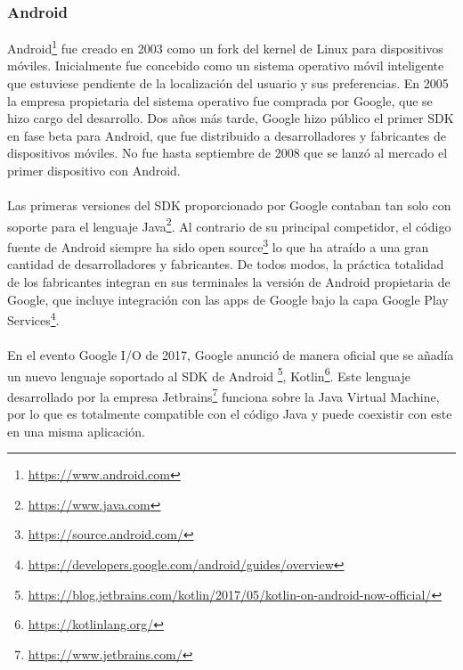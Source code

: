 \documentclass[a4paper, 12pt]{article}
\begin{document}
\subsubsection{Android}
\label{sec-2-1-2}
Android\footnote{\url{https://www.android.com}} fue creado en 2003 como un fork del kernel de Linux para dispositivos
móviles. Inicialmente fue concebido como un sistema operativo móvil inteligente que
estuviese pendiente de la localización del usuario y sus preferencias. En 2005 la
empresa propietaria del sistema operativo fue comprada por Google, que se hizo cargo
del desarrollo. Dos años más tarde, Google hizo público el primer SDK en fase beta
para Android, que fue distribuido a desarrolladores y fabricantes de dispositivos
móviles. No fue hasta septiembre de 2008 que se lanzó al mercado el primer dispositivo
con Android.
\\
\\
Las primeras versiones del SDK proporcionado por Google contaban tan solo con
soporte para el lenguaje Java\footnote{\url{https://www.java.com}}. Al contrario de su principal competidor, el código fuente
de Android siempre ha sido open source\footnote{\url{https://source.android.com/}} lo que ha atraído a una gran cantidad de
desarrolladores y fabricantes. De todos modos, la práctica totalidad de los fabricantes
integran en sus terminales la versión de Android propietaria de Google, que incluye
integración con las apps de Google bajo la capa Google Play Services\footnote{\url{https://developers.google.com/android/guides/overview}}.
\\
\\
En el evento Google I/O de 2017, Google anunció de manera oficial que se añadía un
nuevo lenguaje soportado al SDK de Android \footnote{\url{https://blog.jetbrains.com/kotlin/2017/05/kotlin-on-android-now-official/}}, Kotlin\footnote{\url{https://kotlinlang.org/}}. Este lenguaje desarrollado
por la empresa Jetbrains\footnote{\url{https://www.jetbrains.com/}} funciona sobre la Java Virtual Machine, por lo que es totalmente compatible con el código Java y puede
coexistir con este en una misma aplicación.
\end{document}
